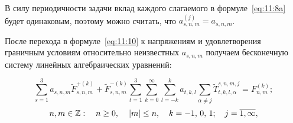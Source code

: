 %
%

В силу периодичности задачи вклад каждого слагаемого в формуле~\eqref{eq:11:8a} будет одинаковым, поэтому можно считать, что $a_{s,n,m}^{(j)}=a_{s,n,m}$.

После перехода в формуле~\eqref{eq:11:10} к напряжениям и удовлетворения граничным условиям относительно неизвестных $a_{s,n,m}$ получаем бесконечную систему линейных алгебраических уравнений:

\begin{equation}
\sum\limits_{s=1}^3 a_{s,n,m}\tilde F_{s,n,m}^{+(k)}+\tilde F_{s,n,m}^{-(k)}\sum\limits_{t=1}^3\sum\limits_{k=0}^\infty\sum\limits_{l=-k}^k a_{t,k,l}\sum\limits_{\alpha\neq j}\tilde T_{t,k,l,\alpha}^{s,n,m,j}=F_{n,m}^{(k)};
\label{eq:11:sys}
\end{equation}
$$
n,m \in\mathbb{Z}:\quad n \ge 0,{\mkern 1mu} \quad {\kern 1pt} |m| \le n,\quad {\mkern 1mu} k =  - 1,{\mkern 1mu} {\kern 1pt} 0,{\mkern 1mu} {\kern 1pt} 1;\;\;\;{\mkern 1mu} {\kern 1pt} j = \overline {1,\infty},
$$

